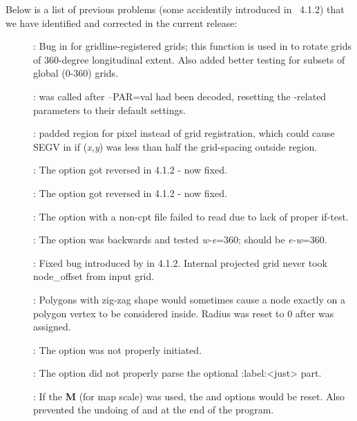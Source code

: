 Below is a list of previous problems (some accidentily introduced in \gmt\ 4.1.2)
that we have identified and corrected in the current release:

\begin{description}
\item []: Bug in  for gridline-registered grids; this function is used in
 to rotate grids of 360-degree longitudinal extent. Also added better testing for subsets of global (0-360) grids.
\item []:  was called after --PAR=val had been decoded, resetting
the \PS-related parameters to their default settings.
\item []:  padded region for pixel instead of grid registration,
which could cause SEGV in  if ({\it x,y}) was less than half the grid-spacing outside region.
\item []: The  option got reversed in 4.1.2 - now fixed.
\item []: The  option got reversed in 4.1.2 - now fixed.
\item []: The  option with a non-cpt file failed to read due to lack of proper if-test.
\item []: The  option was backwards and tested {\it w-e}=360; should be {\it e-w}=360.
\item []: Fixed bug introduced by  in 4.1.2. Internal projected
grid never took node\_offset from input grid.
\item []: Polygons with zig-zag shape would sometimes cause a node exactly
on a polygon vertex to be considered inside. Radius was reset to 0 after  was assigned.
\item []: The  option was not properly initiated.
\item []: The  option did not properly parse the optional :label:<just> part.
\item []: If the {\bf M} (for map scale) was used, the  and  options would be reset.
Also prevented the undoing of  and  at the end of the program.
\end{description}


